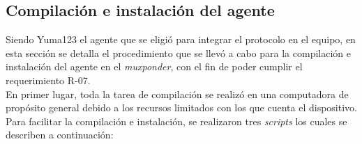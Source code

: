   \subsection{Compilación e instalación del agente}
Siendo Yuma123 el agente que se eligió para integrar el protocolo en el equipo, en esta sección se detalla el procedimiento que se llevó a cabo para la compilación e instalación del agente en el \textit{muxponder}, con el fin de poder cumplir el requerimiento R-07.
\\

  En primer lugar, toda la tarea de compilación se realizó en una computadora de propósito general debido a los recursos limitados con los que cuenta el dispositivo. Para facilitar la compilación e instalación, se realizaron tres \textit{scripts} los cuales se describen a continuación:

